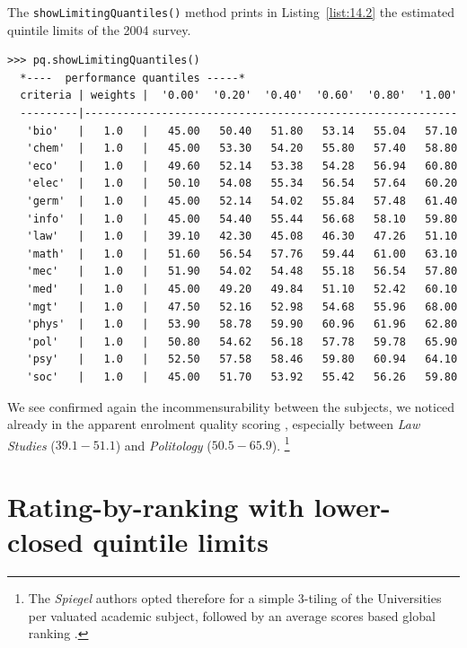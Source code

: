 The \texttt{showLimitingQuantiles()} method prints in Listing~\vref{list:14.2} the estimated quintile limits of the 2004 survey.
\begin{lstlisting}[caption={Estimated quintile limits of the 2004 survey},label=list:14.2,basicstyle=\ttfamily\scriptsize]
>>> pq.showLimitingQuantiles()
  *----  performance quantiles -----*
  criteria | weights |  '0.00'  '0.20'  '0.40'  '0.60'  '0.80'  '1.00'   
  ---------|----------------------------------------------------------
   'bio'   |   1.0   |   45.00   50.40   51.80   53.14   55.04   57.10  
   'chem'  |   1.0   |   45.00   53.30   54.20   55.80   57.40   58.80  
   'eco'   |   1.0   |   49.60   52.14   53.38   54.28   56.94   60.80  
   'elec'  |   1.0   |   50.10   54.08   55.34   56.54   57.64   60.20  
   'germ'  |   1.0   |   45.00   52.14   54.02   55.84   57.48   61.40  
   'info'  |   1.0   |   45.00   54.40   55.44   56.68   58.10   59.80  
   'law'   |   1.0   |   39.10   42.30   45.08   46.30   47.26   51.10  
   'math'  |   1.0   |   51.60   56.54   57.76   59.44   61.00   63.10  
   'mec'   |   1.0   |   51.90   54.02   54.48   55.18   56.54   57.80  
   'med'   |   1.0   |   45.00   49.20   49.84   51.10   52.42   60.10  
   'mgt'   |   1.0   |   47.50   52.16   52.98   54.68   55.96   68.00  
   'phys'  |   1.0   |   53.90   58.78   59.90   60.96   61.96   62.80  
   'pol'   |   1.0   |   50.80   54.62   56.18   57.78   59.78   65.90  
   'psy'   |   1.0   |   52.50   57.58   58.46   59.80   60.94   64.10  
   'soc'   |   1.0   |   45.00   51.70   53.92   55.42   56.26   59.80  
\end{lstlisting}
                     
We see confirmed again the incommensurability between the subjects, we noticed already in the apparent enrolment quality scoring , especially between \emph{Law Studies} ($39.1 - 51.1$) and \emph{Politology} ($50.5 - 65.9$). \footnote{The \emph{Spiegel} authors opted therefore for a simple 3-tiling of the Universities per valuated academic subject, followed by an average \Borda scores based global ranking \citep{SPI-2004}.}


\section{Rating-by-ranking with lower-closed quintile limits}
\label{sec:14.3}


